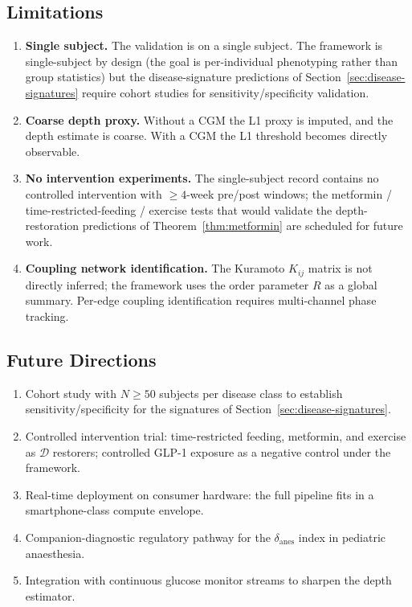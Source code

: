 \documentclass[11pt,twocolumn,a4paper]{article}
\theoremstyle{definition}
\theoremstyle{remark}
\newcommand{\Dhier}{\mathcal{D}}
\newcommand{\Rcoh}{R}
\newcommand{\Korder}{K}
\begin{document}
\subsection{Limitations}

\begin{enumerate}[leftmargin=*]
\item \textbf{Single subject.} The validation is on a single subject.
The framework is single-subject by design (the goal is per-individual
phenotyping rather than group statistics) but the disease-signature
predictions of Section~\ref{sec:disease-signatures} require cohort
studies for sensitivity/specificity validation.
\item \textbf{Coarse depth proxy.} Without a CGM the L1 proxy is
imputed, and the depth estimate is coarse. With a CGM the L1
threshold becomes directly observable.
\item \textbf{No intervention experiments.} The single-subject record
contains no controlled intervention with $\geq 4$-week pre/post
windows; the metformin / time-restricted-feeding / exercise tests
that would validate the depth-restoration predictions of
Theorem~\ref{thm:metformin} are scheduled for future work.
\item \textbf{Coupling network identification.} The Kuramoto
$\Korder_{ij}$ matrix is not directly inferred; the framework uses
the order parameter $\Rcoh$ as a global summary. Per-edge coupling
identification requires multi-channel phase tracking.
\end{enumerate}

\subsection{Future Directions}

\begin{enumerate}[leftmargin=*]
\item Cohort study with $N \geq 50$ subjects per disease class to
establish sensitivity/specificity for the signatures of
Section~\ref{sec:disease-signatures}.
\item Controlled intervention trial: time-restricted feeding,
metformin, and exercise as $\Dhier$ restorers; controlled GLP-1
exposure as a negative control under the framework.
\item Real-time deployment on consumer hardware: the full pipeline
fits in a smartphone-class compute envelope.
\item Companion-diagnostic regulatory pathway for the
$\delta_{\mathrm{anes}}$ index in pediatric anaesthesia.
\item Integration with continuous glucose monitor streams to sharpen
the depth estimator.
\end{enumerate}
\end{document}
